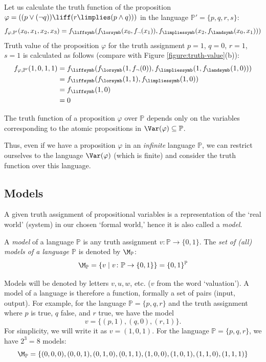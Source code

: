 \begin{example}
    Let us calculate the truth function of the proposition $\varphi = ((p \lor (\neg q)) \liff (r \limplies (p \land q)))$ in the language $\mathbb P'=\{p,q,r,s\}$:
    $$        
    f_{\varphi,\mathbb P'}(x_0,x_1,x_2,x_3)=f_\liffsymb(f_\lorsymb(x_0,f_\neg(x_1)),f_\limpliessymb(x_2,f_\landsymb(x_0,x_1)))    
    $$
    Truth value of the proposition $\varphi$ for the truth assignment $p=1$, $q=0$, $r=1$, $s=1$ is calculated as follows (compare with Figure \ref{figure:truth-value}(b)):
    \begin{align*}
    f_{\varphi,\mathbb P'}(1,0,1,1)
        &=f_\liffsymb(f_\lorsymb(1,f_\neg(0)),f_\limpliessymb(1,f_\landsymb(1,0))) \\
        &=f_\liffsymb(f_\lorsymb(1,1),f_\limpliessymb(1,0))\\
        &=f_\liffsymb(1,0)\\
        &=0
    \end{align*}
\end{example}

\begin{observation}
The truth function of a proposition $\varphi$ over $\mathbb P$ depends only on the variables corresponding to the atomic propositions in $\Var(\varphi)\subseteq\mathbb P$.
\end{observation}

Thus, even if we have a proposition $\varphi$ in an \emph{infinite} language $\mathbb P$, we can restrict ourselves to the language $\Var(\varphi)$ (which is finite) and consider the truth function over this language. 

\subsection{Models}

A given truth assignment of propositional variables is a representation of the `real world' (system) in our chosen `formal world,' hence it is also called a \emph{model}.

\begin{definition}\label{definition:model}
    A \emph{model} of a language $\mathbb P$ is any truth assignment $v\colon \mathbb P\to \{0,1\}$. The \emph{set of (all) models of a language $\mathbb P$} is denoted by $\M_\mathbb P$:
    $$
    \M_\mathbb P=\left\{v \mid v\colon \mathbb P\to \{0,1\}\right\}=\{0,1\}^\mathbb P
    $$
\end{definition}
Models will be denoted by letters $v,u,w$, etc. ($v$ from the word `valuation'). A model of a language is therefore a function, formally a set of pairs (input, output). For example, for the language $\mathbb P=\{p,q,r\}$ and the truth assignment where $p$ is true, $q$ false, and $r$ true, we have the model
$$
v = \{(p,1),(q,0),(r,1)\}.
$$
For simplicity, we will write it as $v = (1,0,1)$. For the language $\mathbb P = \{p,q,r\}$, we have $2^3 = 8$ models: 
$$
\M_\mathbb P = \{(0,0,0),(0,0,1),(0,1,0),(0,1,1),(1,0,0),(1,0,1),(1,1,0),(1,1,1)\}
$$

